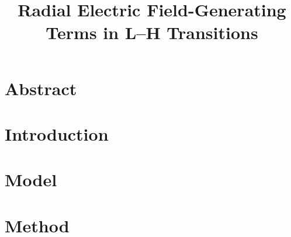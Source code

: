 \documentclass[a4paper,twoside,12pt]{report}
\title{Radial Electric Field-Generating Terms in L--H Transitions}
\author{\me}
\begin{document}



\normalsize

\chapter*{Abstract}\label{chapter:abstract}
%

\tableofcontents


\chapter{Introduction}\label{chapter:introduction}
\setcounter{page}{0}



\clearemptydoublepage

\chapter{Model}\label{chapter:model}



\clearemptydoublepage

\chapter{Method}\label{chapter:method}


\clearemptydoublepage


\appendix
{}


\printbibliography
\end{document}
